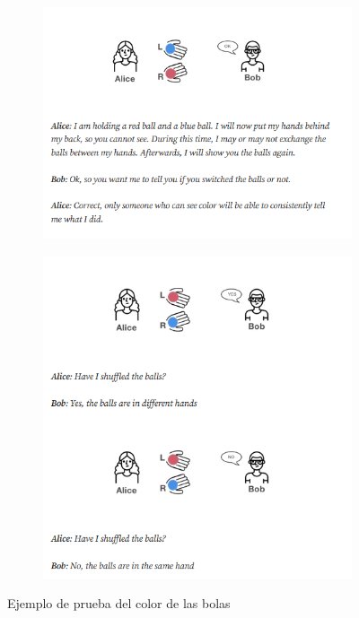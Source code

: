 \begin{figure}[ht]
    \centering
    \begin{subfigure}[c]{0.45\textwidth}
        \includegraphics[width=\textwidth]{images/ballExample1.png}
    \end{subfigure}
    \begin{subfigure}[c]{0.45\textwidth}
        \includegraphics[width=\textwidth]{images/ballExample2.png}
    \end{subfigure}
    \caption{Ejemplo de prueba del color de las bolas \cite{Ball}}
    \label{im:ballExample}
\end{figure}

